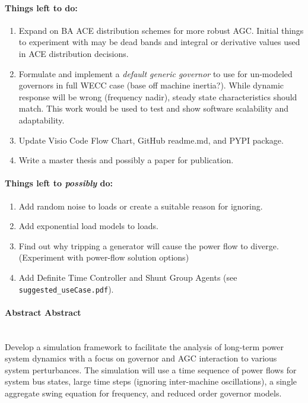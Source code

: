 \documentclass[12pt]{article}
\begin{document}
\paragraph{Things left to do:}%
\begin{enumerate}[label=\Alph*]
	\item Expand on BA ACE distribution schemes for more robust AGC. Initial things to experiment with may be dead bands and integral or derivative values used in ACE distribution decisions.
	
	\item Formulate and implement a \emph{default generic governor} to use for un-modeled governors in full WECC case (base off machine inertia?). While dynamic response will be wrong (frequency nadir), steady state characteristics should match. This work would be used to test and show software scalability and adaptability.
	
	\item Update Visio Code Flow Chart, GitHub readme.md, and PYPI package.
	
	\item Write a master thesis and possibly a paper for publication.
\end{enumerate}

\paragraph{Things left to \emph{possibly} do:}%
\begin{enumerate}[label=\alph*]
	\item Add random noise to loads or create a suitable reason for ignoring.
	
	\item Add exponential load models to loads.
	
	\item Find out why tripping a generator will cause the power flow to diverge. (Experiment with power-flow solution options)
	
	\item Add Definite Time Controller and Shunt Group Agents (see \verb|suggested_useCase.pdf|).
\end{enumerate}


\pagebreak

\paragraph{Abstract Abstract} \ \\
Develop a simulation framework to facilitate the analysis of long-term power system dynamics with a focus on governor and AGC interaction to various system perturbances. The simulation will use a time sequence of power flows for system bus states, large time steps (ignoring inter-machine oscillations),  a single aggregate swing equation for frequency, and reduced order governor models.
\end{document}
